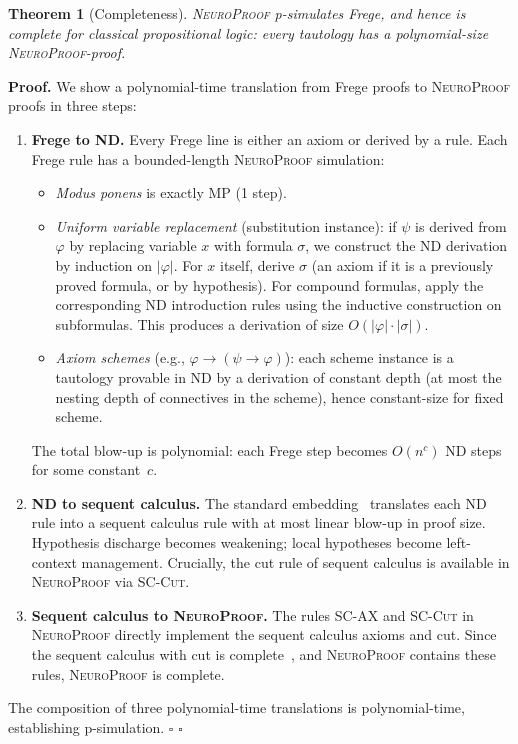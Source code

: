 \documentclass[conference]{IEEEtran}
\newtheorem{theorem}{Theorem}[section]
\newenvironment{proof}[1][Proof]{\textbf{#1.} }{\hfill$\square$}
\newcommand{\NP}{\textsc{NeuroProof}}
\begin{document}
\begin{theorem}[Completeness]
  \label{thm:completeness}
  \NP{} p-simulates Frege, and hence is complete for classical
  propositional logic: every tautology has a polynomial-size
  \NP{}-proof.
\end{theorem}
\begin{proof}
  We show a polynomial-time translation from Frege proofs to
  \NP{} proofs in three steps:
  \begin{enumerate}
    \item \textbf{Frege to ND.}  Every Frege line is either an axiom
      or derived by a rule.  Each Frege rule has a bounded-length
      \NP{} simulation:
      \begin{itemize}
        \item \emph{Modus ponens} is exactly \textsc{MP} (1 step).
        \item \emph{Uniform variable replacement} (substitution
          instance): if $\psi$ is derived from $\varphi$ by replacing
          variable $x$ with formula $\sigma$, we construct the ND
          derivation by induction on $|\varphi|$.  For $x$ itself,
          derive $\sigma$ (an axiom if it is a previously proved
          formula, or by hypothesis).  For compound formulas, apply
          the corresponding ND introduction rules using the
          inductive construction on subformulas.  This produces a
          derivation of size $O(|\varphi| \cdot |\sigma|)$.
        \item \emph{Axiom schemes} (e.g., $\varphi \to (\psi \to \varphi)$):
          each scheme instance is a tautology provable in ND by a
          derivation of constant depth (at most the nesting depth of
          connectives in the scheme), hence constant-size for fixed
          scheme.
      \end{itemize}
      The total blow-up is polynomial: each Frege step becomes $O(n^c)$
      ND steps for some constant~$c$.

    \item \textbf{ND to sequent calculus.}  The standard
      embedding~\cite{TroelstraSchwichtenberg2000} translates each
      ND rule into a sequent calculus rule with at most linear blow-up
      in proof size.  Hypothesis discharge becomes weakening; local
      hypotheses become left-context management.  Crucially,
      the cut rule of sequent calculus is available in \NP{}
      via \textsc{SC-Cut}.

    \item \textbf{Sequent calculus to \NP{}.}  The rules
      \textsc{SC-AX} and \textsc{SC-Cut} in \NP{} directly implement
      the sequent calculus axioms and cut.  Since the sequent calculus
      with cut is complete~\cite{TroelstraSchwichtenberg2000}, and
      \NP{} contains these rules, \NP{} is complete.
  \end{enumerate}
  The composition of three polynomial-time translations is
  polynomial-time, establishing p-simulation.  \hfill$\square$
\end{proof}
\end{document}
